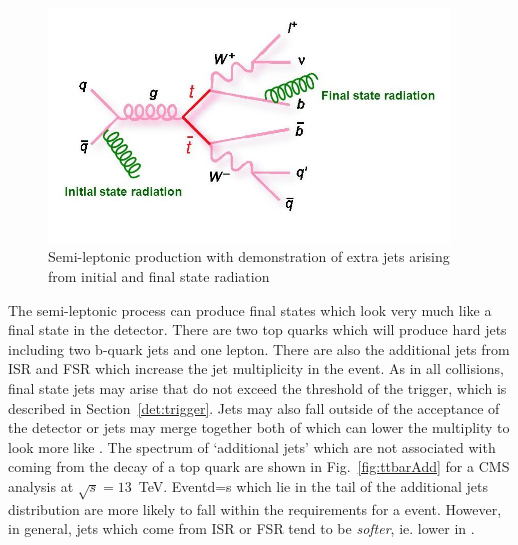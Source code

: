 \begin{figure}[ht!]
\begin{center}
    \includegraphics[width=0.95\textwidth]{images/Theory/ttbarISRFSR.jpg}
    \caption{Semi-leptonic \ttbar production with demonstration of extra jets arising from initial and final state radiation}
    \label{fig:ttbarback}
\end{center}
\end{figure}

The semi-leptonic \ttbar process can produce final states which look very much like a \tttt final state in the detector. There are two top quarks which will produce hard jets including two b-quark jets and one lepton. There are also the additional jets from ISR and FSR which increase the jet multiplicity in the event. As in all collisions, final state jets may arise that do not exceed the \pt threshold of the trigger, which is described in Section~\ref{det:trigger}. Jets may also fall outside of the acceptance of the detector or jets may merge together both of which can lower the \tttt multiplity to look more like \ttbar. 
The spectrum of `additional jets' which are not associated with coming from the decay of a top quark are shown in Fig.~\ref{fig:ttbarAdd} for a CMS analysis at $\sqrt{s}=13$~TeV. Eventd=s which lie in the tail of the additional jets distribution are more likely to fall within the requirements for a \tttt event. However, in general, jets which come from ISR or FSR tend to be \emph{softer}, ie. lower in \pt.

